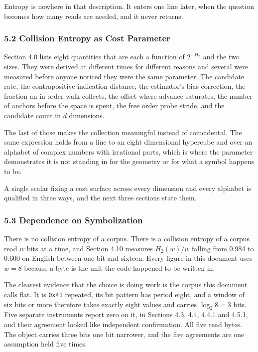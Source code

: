 Entropy is nowhere in that description. It enters one line later, when the question becomes how many reads are needed, and it never returns.

\subsubsection{5.2 Collision Entropy as Cost Parameter}

Section 4.0 lists eight quantities that are each a function of \(2^{-H_2}\) and the two sizes. They were derived at different times for different reasons and several were measured before anyone noticed they were the same parameter. The candidate rate, the contrapositive indication distance, the estimator's bias correction, the fraction an in-order walk collects, the offset where advance saturates, the number of anchors before the space is spent, the free order probe stride, and the candidate count in \(d\) dimensions.

The last of those makes the collection meaningful instead of coincidental. The same expression holds from a line to an eight dimensional hypercube and over an alphabet of complex numbers with irrational parts, which is where the parameter demonstrates it is not standing in for the geometry or for what a symbol happens to be.

A single scalar fixing a cost surface across every dimension and every alphabet is qualified in three ways, and the next three sections state them.

\subsubsection{5.3 Dependence on Symbolization}

There is no collision entropy of a corpus. There is a collision entropy of a corpus read \(w\) bits at a time, and Section 4.10 measures \(H_2(w)/w\) falling from 0.984 to 0.600 on English between one bit and sixteen. Every figure in this document uses \(w = 8\) because a byte is the unit the code happened to be written in.

The clearest evidence that the choice is doing work is the corpus this document calls flat. It is \texttt{0x41} repeated, its bit pattern has period eight, and a window of six bits or more therefore takes exactly eight values and carries \(\log_2 8 = 3\) bits. Five separate instruments report zero on it, in Sections 4.3, 4.4, 4.4.1 and 4.5.1, and their agreement looked like independent confirmation. All five read bytes. The object carries three bits one bit narrower, and the five agreements are one assumption held five times.

